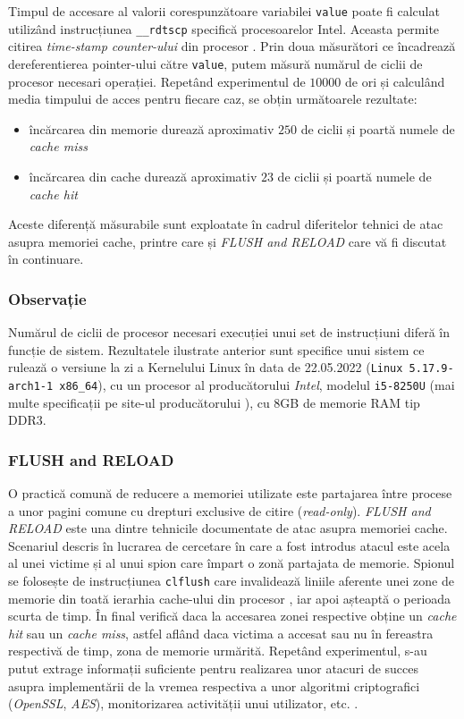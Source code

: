 Timpul de accesare al valorii corespunzătoare variabilei \texttt{value} poate
fi calculat utilizând instrucțiunea \texttt{\_\_rdtscp} specifică procesoarelor
Intel. Aceasta permite citirea \emph{time-stamp counter-ului} din procesor
\cite{rdtscp}. Prin doua măsurători ce încadrează dereferentierea pointer-ului
către \texttt{value}, putem măsură numărul de ciclii de procesor necesari
operației. Repetând experimentul de $10000$ de ori și calculând media
timpului de acces pentru fiecare caz, se obțin următoarele rezultate:

\begin{itemize}
  \setlength\itemsep{0em}
  \item încărcarea din memorie durează aproximativ $250$ de ciclii și poartă
    numele de \emph{cache miss}
  \item încărcarea din cache durează aproximativ $23$ de ciclii și poartă
    numele de \emph{cache hit}
\end{itemize}

Aceste diferență măsurabile sunt exploatate în cadrul diferitelor
tehnici de atac asupra memoriei cache, printre care și \emph{FLUSH and RELOAD}
care vă fi discutat în continuare.

\subsubsection{Observație}

Numărul de ciclii de procesor necesari execuției unui set de instrucțiuni
diferă în funcție de sistem. Rezultatele ilustrate anterior sunt specifice unui
sistem ce rulează o versiune la zi a Kernelului Linux în data de
22.05.2022 (\texttt{Linux 5.17.9-arch1-1 x86\_64}), cu un procesor al
producătorului \emph{Intel}, modelul \texttt{i5-8250U} (mai multe specificații
pe site-ul producătorului \cite{i5_8250U}), cu 8GB de memorie RAM tip DDR3.

\subsubsection{FLUSH and RELOAD}\label{sec:flush_reload}

O practică comună de reducere a memoriei utilizate este partajarea între
procese a unor pagini comune cu drepturi exclusive de citire
(\emph{read-only}). \emph{FLUSH and RELOAD} este una dintre tehnicile
documentate de atac asupra memoriei cache. Scenariul descris în lucrarea de
cercetare în care a fost introdus atacul este acela al unei victime și al unui
spion care împart o zonă partajata de memorie. Spionul se folosește de
instrucțiunea \texttt{clflush} care invalidează liniile aferente unei zone de
memorie din toată ierarhia cache-ului din procesor \cite{clflush}, iar apoi
așteaptă o perioada scurta de timp. În final verifică daca la accesarea zonei
respective obține un \emph{cache hit} sau un \emph{cache miss}, astfel aflând
daca victima a accesat sau nu în fereastra respectivă de timp, zona de memorie
urmărită. Repetând experimentul, s-au putut extrage informații suficiente
pentru realizarea unor atacuri de succes asupra implementării de la vremea
respectiva a unor algoritmi criptografici (\emph{OpenSSL}, \emph{AES}),
monitorizarea activității unui utilizator, etc. \cite{flush_reload}.

